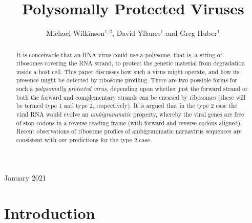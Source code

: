 \documentclass[12pt]{iopart}
\begin{document}
\title[Polysomally Protected Viruses]{Polysomally Protected Viruses}

\author{Michael Wilkinson$^{1,2}$, David  Yllanes$^1$ and Greg Huber$^1$}

\address{$^1$ Chan Zuckerberg Biohub, 499 Illinois Street, San Francisco, CA 94158, USA\\
$^2$ School of Mathematics and Statistics, The Open University,Walton Hall, Milton Keynes, MK7 6AA, UK}

\vspace{10pt}
\begin{indented}
\item[]January 2021
\end{indented}

\begin{abstract}
It is conceivable that an RNA  virus could use a polysome, that is, a string of ribosomes covering the RNA strand, 
to protect the genetic material from degradation inside a host cell. This paper discusses how such a 
virus might operate, and how its presence might be detected by ribosome profiling. There are two possible 
forms for such a \emph{polysomally protected virus}, depending upon whether just the forward strand or 
both the forward and complementary strands can be encased by ribosomes (these will be termed type 1 
and type 2, respectively). It is argued that in the type 2 case the viral RNA would evolve an 
\emph{ambigrammatic} property, whereby the viral genes are free of stop codons in a reverse 
reading frame (with forward and reverse codons aligned). 
Recent observations of ribosome profiles of ambigrammatic narnavirus sequences are consistent 
with our predictions for the type 2 case.
\end{abstract}


\section{Introduction}
\end{document}
